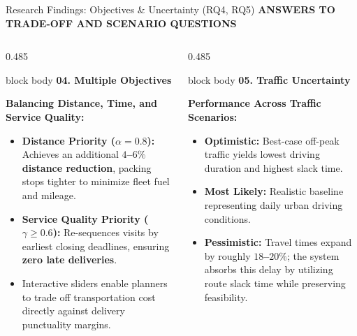 \documentclass[aspectratio=169,10pt]{beamer}
\newcommand{\sectiontag}[1]{%
    {\scriptsize\bfseries\color{Accent}\MakeUppercase{#1}}\par\vspace{0.08cm}
}
\begin{document}
\begin{frame}{Research Findings: Objectives \& Uncertainty (RQ4, RQ5)}
\sectiontag{Answers to Trade-Off and Scenario Questions}

\vspace{-0.2cm}

\begin{columns}[T,totalwidth=\textwidth]

    \begin{column}{0.485\textwidth}
        \begin{beamercolorbox}[rounded=true,shadow=false,wd=\linewidth,sep=3.5pt]{block body}
            {\bfseries\color{Primary}\small 04. Multiple Objectives }\par\vspace{0.02cm}
            \footnotesize
            \textbf{Balancing Distance, Time, and Service Quality:}
            \begin{itemize}
                \setlength{\itemsep}{0.5pt}
                \scriptsize
                \item \textbf{Distance Priority ($\alpha=0.8$):} Achieves an additional \textbf{$4$--$6\%$ distance reduction}, packing stops tighter to minimize fleet fuel and mileage.
                \item \textbf{Service Quality Priority ($\gamma \ge 0.6$):} Re-sequences visits by earliest closing deadlines, ensuring \textbf{zero late deliveries}.
                \item Interactive sliders enable planners to trade off transportation cost directly against delivery punctuality margins.
            \end{itemize}
        \end{beamercolorbox}
    \end{column}

    \begin{column}{0.485\textwidth}
        \begin{beamercolorbox}[rounded=true,shadow=false,wd=\linewidth,sep=3.5pt]{block body}
            {\bfseries\color{Primary}\small 05. Traffic Uncertainty }\par\vspace{0.02cm}
            \footnotesize
            \textbf{Performance Across Traffic Scenarios:}
            \begin{itemize}
                \setlength{\itemsep}{0.5pt}
                \scriptsize
                \item \textbf{Optimistic:} Best-case off-peak traffic yields lowest driving duration and highest slack time.
                \item \textbf{Most Likely:} Realistic baseline representing daily urban driving conditions.
                \item \textbf{Pessimistic:} Travel times expand by roughly \textbf{$18$--$20\%$}; the system absorbs this delay by utilizing route slack time while preserving feasibility.
            \end{itemize}
        \end{beamercolorbox}
    \end{column}


\end{columns}
\end{frame}
\end{document}
